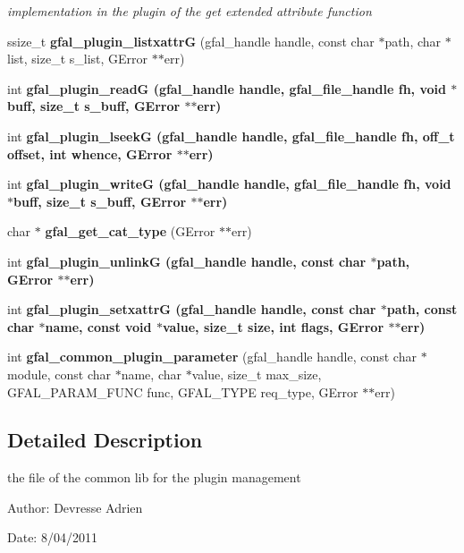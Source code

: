 \begin{CompactItemize}
\begin{CompactList}\small\item\em implementation in the plugin of the get extended attribute function \item\end{CompactList}\item 
ssize\_\-t \textbf{gfal\_\-plugin\_\-listxattr\-G} (gfal\_\-handle handle, const char $\ast$path, char $\ast$list, size\_\-t s\_\-list, GError $\ast$$\ast$err)\label{gfal__common__plugin_8c_ef696550c6ac4bab6dec58d7c857b3f4}

\item 
int \bf{gfal\_\-plugin\_\-read\-G} (gfal\_\-handle handle, gfal\_\-file\_\-handle fh, void $\ast$buff, size\_\-t s\_\-buff, GError $\ast$$\ast$err)
\item 
int \bf{gfal\_\-plugin\_\-lseek\-G} (gfal\_\-handle handle, gfal\_\-file\_\-handle fh, off\_\-t offset, int whence, GError $\ast$$\ast$err)
\item 
int \bf{gfal\_\-plugin\_\-write\-G} (gfal\_\-handle handle, gfal\_\-file\_\-handle fh, void $\ast$buff, size\_\-t s\_\-buff, GError $\ast$$\ast$err)
\item 
char $\ast$ \textbf{gfal\_\-get\_\-cat\_\-type} (GError $\ast$$\ast$err)\label{gfal__common__plugin_8c_c20aa1a376c802d0c60208854537851e}

\item 
int \bf{gfal\_\-plugin\_\-unlink\-G} (gfal\_\-handle handle, const char $\ast$path, GError $\ast$$\ast$err)
\item 
int \bf{gfal\_\-plugin\_\-setxattr\-G} (gfal\_\-handle handle, const char $\ast$path, const char $\ast$name, const void $\ast$value, size\_\-t size, int flags, GError $\ast$$\ast$err)
\item 
int \textbf{gfal\_\-common\_\-plugin\_\-parameter} (gfal\_\-handle handle, const char $\ast$module, const char $\ast$name, char $\ast$value, size\_\-t max\_\-size, GFAL\_\-PARAM\_\-FUNC func, GFAL\_\-TYPE req\_\-type, GError $\ast$$\ast$err)\label{gfal__common__plugin_8c_7d56cca8673fb6b3c6e98111754ea6c4}

\end{CompactItemize}


\subsection{Detailed Description}
the file of the common lib for the plugin management 

\begin{Desc}
\item[Author:]Devresse Adrien \end{Desc}
\begin{Desc}
\item[Date:]8/04/2011 \end{Desc}


